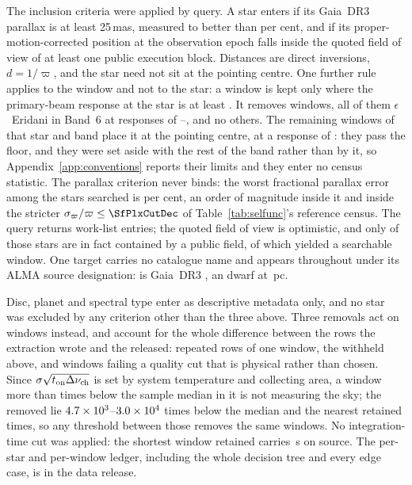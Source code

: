 The inclusion criteria were applied by query. A star enters
if its Gaia~DR3 parallax is at least 25\,mas, measured to better than
\PlxAdqlPct{} per cent, and if its proper-motion-corrected position at the
observation epoch falls inside the quoted field of view of at least one
public execution block. Distances are direct inversions, $d=1/\varpi$, and
the star need not sit at the pointing centre. One further rule applies to the
window and not to the star: a window is kept only where the primary-beam
response at the star is at least \PbFloorResp. It removes \EpsEriNOffAxis{}
windows, all of them $\epsilon$~Eridani in Band~6 at responses of
\LqEpsRespLo--\LqEpsRespHi, and no others. The remaining \EpsEriNOnAxis{}
windows of that star and band place it at the pointing centre, at a response
of \LqEpsRespOn: they pass the floor, and they were set aside with the rest
of the band rather than by it, so Appendix~\ref{app:conventions} reports
their limits and they enter no census statistic. The parallax
criterion never binds: the worst fractional parallax error among the stars
searched is \SfPlxWorstPct{} per cent, an order of magnitude inside it and
inside the stricter $\sigma_\varpi/\varpi\le\SfPlxCutDec$ of
Table~\ref{tab:selfunc}'s reference census. The query returns
\NCensus{} work-list entries; the quoted field of view is optimistic, and
only \NGenuinelyCovered{} of those stars are in fact contained by a public
field, of which \NStars{} yielded a searchable window. One target carries no
catalogue name and appears throughout under its ALMA source designation:
\BkAlmaName{} is Gaia~DR3 \BkAlmaGaia, an \BkAlmaSpType{} dwarf at
\BkAlmaDistPc\,pc.

Disc, planet and spectral type enter as descriptive metadata only, and no
star was excluded by any criterion other than the three above. Three removals
act on windows instead, and account for the whole difference between the
\LqNExport{} rows the extraction wrote and the \NWindows{} released:
\NDup{} repeated rows of one window, the \NWithheld{} withheld above, and
\NDefect{} windows failing a quality cut that is physical rather than chosen.
Since $\sigma\sqrt{t_{\rm on}\Delta\nu_{\rm ch}}$ is set by system
temperature and collecting area, a window more than \LqDefectCut{} times
below the sample median in it is not measuring the sky; the \NDefect{}
removed lie $4.7\times10^{3}$--$3.0\times10^{4}$ times below the median and the
nearest retained \LqKeptFac{} times, so any threshold between those removes
the same windows. No integration-time cut was applied: the shortest window
retained carries \LqOnsrcMin\,s on source. The per-star and per-window
ledger, including the whole decision tree and every edge case, is in the data
release.


